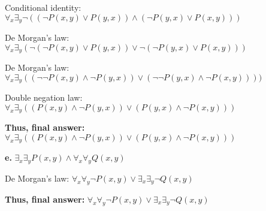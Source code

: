 \documentclass[11pt]{article}
\begin{document}
	Conditional identity:
	$\forall_x \exists_y \neg ((\neg P(x,y)\vee P(y,x))\wedge (\neg P(y,x)\vee P(x,y)))$
	
	De Morgan's law:
	$\forall_x \exists_y (\neg (\neg P(x,y)\vee P(y,x))\vee \neg(\neg P(y,x)\vee P(x,y)))$
	
	De Morgan's law:
	$\forall_x \exists_y ((\neg \neg P(x,y)\wedge \neg P(y,x))\vee (\neg \neg P(y,x)\wedge \neg P(x,y))))$
	
	Double negation law:
	$\forall_x \exists_y ((P(x,y)\wedge \neg P(y,x))\vee (P(y,x)\wedge \neg P(x,y)))$
	
	\textbf{Thus, final answer: }
	$\forall_x \exists_y ((P(x,y)\wedge \neg P(y,x))\vee (P(y,x)\wedge \neg P(x,y)))$
	\vspace{2mm}
	
	\textbf{e.}
	$\exists_x \exists_y P(x,y)\wedge \forall_x \forall_y Q(x,y)$
	
	De Morgan's law:
	$\forall_x \forall_y \neg P(x,y)\vee \exists_x \exists_y \neg Q(x,y)$
	
	\textbf{Thus, final answer: }
	$\forall_x \forall_y \neg P(x,y)\vee \exists_x \exists_y \neg Q(x,y)$
\end{document}
